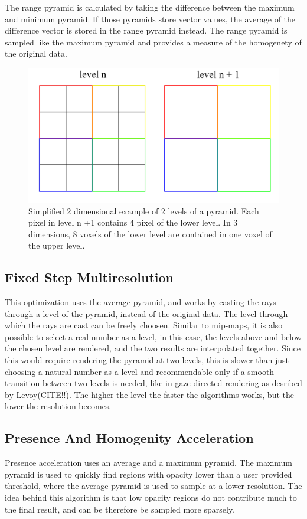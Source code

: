 {The range pyramid is calculated by taking the difference between the maximum and minimum pyramid. If those pyramids store vector values, the average of the difference vector is stored in the range pyramid instead.
The range pyramid is sampled like the maximum pyramid and provides a measure of the homogenety of the original data.
 \begin{figure}[htb]
  \centering
  \includegraphics[width=.8\linewidth]{pyramide.png}
  \parbox[t]{.9\columnwidth}{\relax}
  \caption{\label{fig:firstExample}
         Simplified 2 dimensional example of 2 levels of a pyramid. Each pixel in level n +1 contains 4 pixel of the lower level. In 3 dimensions, 8 voxels of the lower level are contained in one voxel of the upper level.}
\end{figure}


\subsection{Fixed Step Multiresolution}
This optimization uses the average pyramid, and works by casting the rays through a level of the pyramid, instead of the original data. The level through which the rays are cast can be freely choosen. Similar to mip-maps, it is also possible to select a real number as a level, in this case, the levels above and below the chosen level are rendered, and the two results are interpolated together. Since this would require rendering the pyramid at two levels, this is slower than just choosing a natural number as a level and recommendable only if a smooth transition between two levels is needed, like in gaze directed rendering as desribed by Levoy(CITE!!). The higher the level the faster the algorithms works, but the lower the resolution becomes.
\subsection{Presence And Homogenity Acceleration}
Presence acceleration uses an average and a maximum pyramid. The maximum pyramid is used to quickly find regions with opacity lower than a user provided threshold, where the average pyramid is used to sample at a lower resolution. The idea behind this algorithm is that low opacity regions do not contribute much to the final result, and can be therefore be sampled more sparsely.

}
